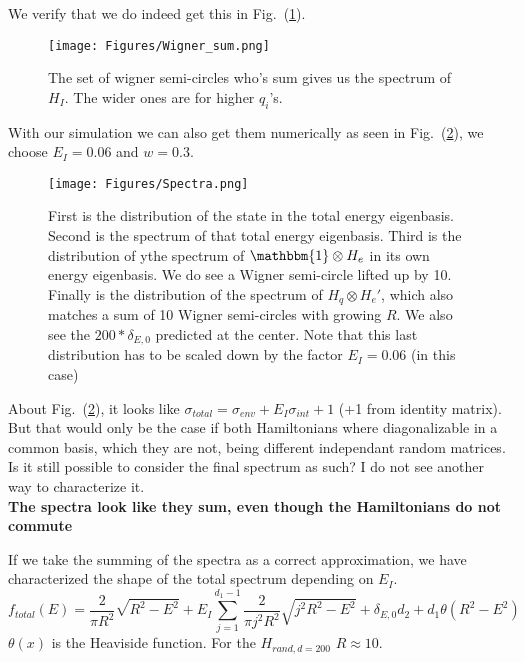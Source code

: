 \documentclass{article}
\begin{document}
We verify that we do indeed get this in Fig.~(\ref{fig:wigner_sum}). 

\begin{figure}[h]
    \centering
    \texttt{[image: Figures/Wigner\_sum.png]}
    \caption{The set of wigner semi-circles who's sum gives us the spectrum of $H_I$. The wider ones are for higher $q_i$'s.}
    \label{fig:wigner_sum}
\end{figure}

With our simulation we can also get them numerically as seen in Fig.~(\ref{fig:spectra}), we choose $E_I=0.06$ and $w=0.3$.
\begin{figure}
    \centering
    \texttt{[image: Figures/Spectra.png]}
    \caption{First is the distribution of the state in the total energy eigenbasis. Second is the spectrum of that total energy eigenbasis. Third is the distribution of ythe spectrum of $\mathbbm{1}\otimes H_e$ in its own energy eigenbasis. We do see a Wigner semi-circle lifted up by 10. Finally is the distribution of the spectrum of $H_q\otimes H_e'$, which also matches a sum of 10 Wigner semi-circles with growing $R$. We also see the $200*\delta_{E,0}$ predicted at the center. Note that this last distribution has to be scaled down by the factor $E_I=0.06$ (in this case)}
    \label{fig:spectra}
\end{figure}

About Fig.~(\ref{fig:spectra}), it looks like $\sigma_{total}=\sigma_{env}+E_I\sigma_{int} + 1$ (+1 from identity matrix). But that would only be the case if both Hamiltonians where diagonalizable in a common basis, which they are not, being different independant random matrices. Is it still possible to consider the final spectrum as such? I do not see another way to characterize it.\\

{\color{teal} \textbf{The spectra look like they sum, even though the Hamiltonians do not commute}}

If we take the summing of the spectra as a correct approximation, we have characterized the shape of the total spectrum depending on $E_I$. 
\begin{equation}
    f_{total}(E) = \frac{2}{\pi R^2}\sqrt{R^2-E^2} + E_I\sum_{j=1}^{d_1-1}\frac{2}{\pi j^2R^2}\sqrt{j^2R^2-E^2} + \delta_{E,0}d_2 + d_1\theta(R^2-E^2)
\end{equation}
$\theta(x)$ is the Heaviside function. For the $H_{rand, d=200}$ $R\approx 10$.\\
\end{document}
